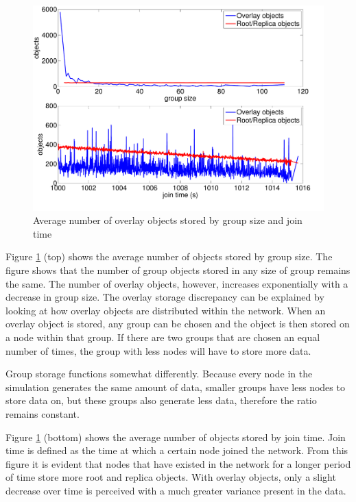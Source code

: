 \documentclass[10pt,a4paper,conference]{IEEEtran}
\begin{document}
\begin{figure}[htbp]
 \centering
 \includegraphics[clip=true, viewport=0cm 1cm 28.5cm 21cm, width=\columnwidth]{ObjectsByJtGs}
 \caption{Average number of overlay objects stored by group size and join time}
 \label{fig_objects_by_groupsize_jointime}
\end{figure}
%
Figure \ref{fig_objects_by_groupsize_jointime} (top) shows the average number of objects stored by group size. The figure shows that the number of
group objects stored in any size of group remains the same. The number of overlay objects, however, increases exponentially with a decrease in group
size. The overlay storage discrepancy can be explained by looking at how overlay objects are distributed within the network. When an overlay object
is stored, any group can be chosen and the object is then stored on a node within that group. If there are two groups that are chosen an equal number
of times, the group with less nodes will have to store more data.

Group storage functions somewhat differently. Because every node in the simulation generates the same amount of data, smaller groups have less nodes
to store data on, but these groups also generate less data, therefore the ratio remains constant.

Figure \ref{fig_objects_by_groupsize_jointime} (bottom) shows the average number of objects stored by join time. Join time is defined as the time at
which a certain node joined the network. From this figure it is evident that nodes that have existed in the network for a longer period of time store
more root and replica objects. With overlay objects, only a slight decrease over time is perceived with a much greater variance present in the data.
\end{document}
